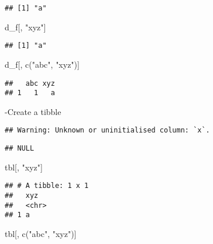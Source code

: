 \documentclass[
]{article}
\newenvironment{Shaded}{\begin{snugshade}}{\end{snugshade}}
\newcommand{\FunctionTok}[1]{\textcolor[rgb]{0.00,0.00,0.00}{#1}}
\newcommand{\NormalTok}[1]{#1}
\newcommand{\OtherTok}[1]{\textcolor[rgb]{0.56,0.35,0.01}{#1}}
\newcommand{\SpecialCharTok}[1]{\textcolor[rgb]{0.00,0.00,0.00}{#1}}
\newcommand{\StringTok}[1]{\textcolor[rgb]{0.31,0.60,0.02}{#1}}
\begin{document}
\begin{verbatim}
## [1] "a"
\end{verbatim}

\begin{Shaded}
\begin{Highlighting}[]
\NormalTok{d\_f[, }\StringTok{"xyz"}\NormalTok{]}
\end{Highlighting}
\end{Shaded}

\begin{verbatim}
## [1] "a"
\end{verbatim}

\begin{Shaded}
\begin{Highlighting}[]
\NormalTok{d\_f[, }\FunctionTok{c}\NormalTok{(}\StringTok{"abc"}\NormalTok{, }\StringTok{"xyz"}\NormalTok{)]}
\end{Highlighting}
\end{Shaded}

\begin{verbatim}
##   abc xyz
## 1   1   a
\end{verbatim}

-Create a tibble

\begin{Shaded}
\end{Shaded}

\begin{verbatim}
## Warning: Unknown or uninitialised column: `x`.
\end{verbatim}

\begin{verbatim}
## NULL
\end{verbatim}

\begin{Shaded}
\begin{Highlighting}[]
\NormalTok{tbl[, }\StringTok{"xyz"}\NormalTok{]}
\end{Highlighting}
\end{Shaded}

\begin{verbatim}
## # A tibble: 1 x 1
##   xyz  
##   <chr>
## 1 a
\end{verbatim}

\begin{Shaded}
\begin{Highlighting}[]
\NormalTok{tbl[, }\FunctionTok{c}\NormalTok{(}\StringTok{"abc"}\NormalTok{, }\StringTok{"xyz"}\NormalTok{)]}
\end{Highlighting}
\end{Shaded}
\end{document}
